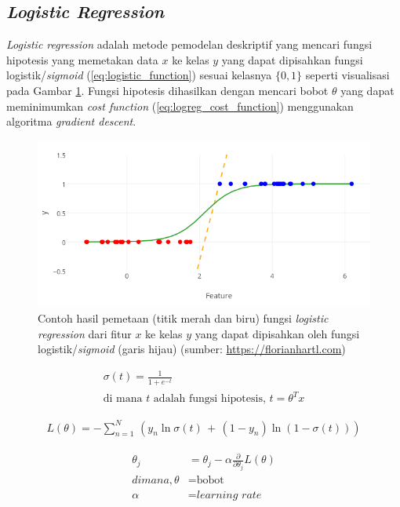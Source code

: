 \subsection{\textit{Logistic Regression}}

\textit{Logistic regression} adalah metode pemodelan deskriptif yang mencari fungsi hipotesis yang memetakan data $x$ ke kelas $y$ yang dapat dipisahkan fungsi logistik/\textit{sigmoid} (\ref{eq:logistic_function}) sesuai kelasnya $\{0,1\}$ \citep{theodoridis2015machine} seperti visualisasi pada Gambar \ref{fig:logreg}. Fungsi hipotesis dihasilkan dengan mencari bobot $\theta$ yang dapat meminimumkan \textit{cost function} (\ref{eq:logreg_cost_function}) menggunakan algoritma \textit{gradient descent}.

\begin{figure}
\centering
\includegraphics[scale=0.5]{../images/logreg.png}
\caption{Contoh hasil pemetaan (titik merah dan biru) fungsi \textit{logistic regression} dari fitur $x$ ke kelas $y$ yang dapat dipisahkan oleh fungsi logistik/\textit{sigmoid} (garis hijau) (sumber: \url{https://florianhartl.com})}
\label{fig:logreg}
\end{figure}


\noindent \begin{align}\label{eq:logistic_function}
	\sigma(t) = {\frac {1}{1+e^{-t}}} \\[0.2cm]
	\textrm{di mana $t$ adalah fungsi hipotesis, } t = \theta^{T}x \nonumber 
\end{align}

\noindent \begin{align}\label{eq:logreg_cost_function}
	L(\theta) = - \sum_{n=1}^{N} \, (y_{n} \ln \sigma(t) \, + \, (1 - y_{n}) \ln (1 - \sigma(t)))
\end{align}

\noindent \begin{align}\label{eq:gradient_descent}
	\theta_{j} &= \theta_{j} - \alpha \frac{\partial}{\partial \theta_{j}} L(\theta) \\ \nonumber 
	di mana, \theta &= \textrm{bobot} \\ \nonumber 
			 \alpha &= \textit{learning rate} \\ \nonumber 		 
\end{align}


